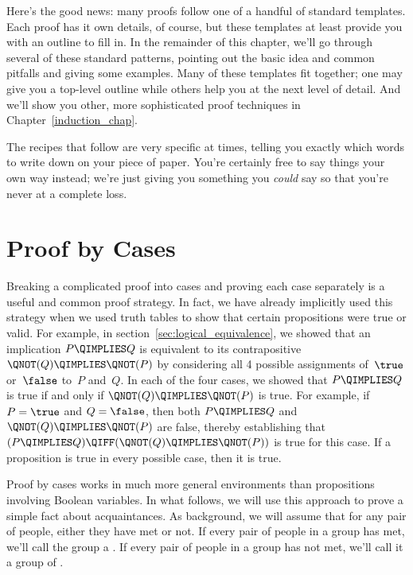 Here's the good news: many proofs follow one of a handful of standard
templates.  Each proof has it own details, of course, but these
templates at least provide you with an outline to fill in.  In the
remainder of this chapter, we'll go
through several of these standard patterns, pointing out the basic
idea and common pitfalls and giving some examples.  Many of these
templates fit together; one may give you a top-level outline while
others help you at the next level of detail.  And we'll show you
other, more sophisticated proof techniques in
Chapter~\ref{induction_chap}.

The recipes that follow are very specific at times, telling you exactly
which words to write down on your piece of paper.  You're certainly
free to say things your own way instead; we're just giving you
something you \textit{could} say so that you're never at a complete
loss.

\section{Proof by Cases}

Breaking a complicated proof into cases and proving each case
separately is a useful and common proof strategy.  In fact, we have
already implicitly used this strategy when we used truth tables to
show that certain propositions were true or valid.  For example, in
section~\ref{sec:logical_equivalence}, we showed that an implication
$P \QIMPLIES Q$ is equivalent to its contrapositive $\QNOT(Q)
\QIMPLIES \QNOT(P)$ by considering all 4 possible assignments
of~$\true$ or~$\false$ to~$P$ and~$Q$.  In each of the four cases, we
showed that $P \QIMPLIES Q$ is true if and only if $\QNOT(Q) \QIMPLIES
\QNOT(P)$ is true.  For example, if $P = \true$ and $Q = \false$, then
both $P \QIMPLIES Q$ and $\QNOT(Q) \QIMPLIES \QNOT(P)$ are false,
thereby establishing that $(P \QIMPLIES Q) \QIFF (\QNOT(Q) \QIMPLIES
\QNOT(P))$ is true for this case.  If a proposition is true in every
possible case, then it is true.

Proof by cases works in much more general environments than
propositions involving Boolean variables.  In what follows, we will
use this approach to prove a simple fact about acquaintances.  As
background, we will assume that for any pair of people, either they
have met or not.  If every pair of people in a group has met, we'll
call the group a .  If every pair of people in a group has
not met, we'll call it a group of .

